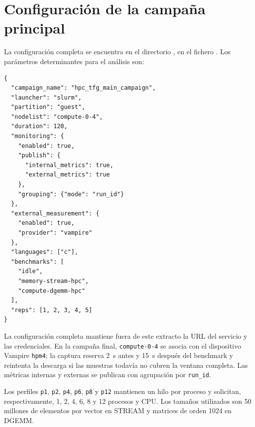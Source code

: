 \chapter{Configuración de la campaña principal}
\label{anexo:campania}

La configuración completa se encuentra en el directorio , en el fichero . Los parámetros determinantes para el análisis son:

\begin{lstlisting}
{
  "campaign_name": "hpc_tfg_main_campaign",
  "launcher": "slurm",
  "partition": "guest",
  "nodelist": "compute-0-4",
  "duration": 120,
  "monitoring": {
    "enabled": true,
    "publish": {
      "internal_metrics": true,
      "external_metrics": true
    },
    "grouping": {"mode": "run_id"}
  },
  "external_measurement": {
    "enabled": true,
    "provider": "vampire"
  },
  "languages": ["c"],
  "benchmarks": [
    "idle",
    "memory-stream-hpc",
    "compute-dgemm-hpc"
  ],
  "reps": [1, 2, 3, 4, 5]
}
\end{lstlisting}

La configuración completa mantiene fuera de este extracto la URL del servicio y las credenciales. En la campaña final, \texttt{compute-0-4} se asocia con el dispositivo Vampire \texttt{hpm4}; la captura reserva 2~s antes y 15~s después del benchmark y reintenta la descarga si las muestras todavía no cubren la ventana completa. Las métricas internas y externas se publican con agrupación por \texttt{run\_id}.

Los perfiles \texttt{p1}, \texttt{p2}, \texttt{p4}, \texttt{p6}, \texttt{p8} y \texttt{p12} mantienen un hilo por proceso y solicitan, respectivamente, 1, 2, 4, 6, 8 y 12 procesos y CPU. Los tamaños utilizados son 50 millones de elementos por vector en STREAM y matrices de orden 1024 en DGEMM.
